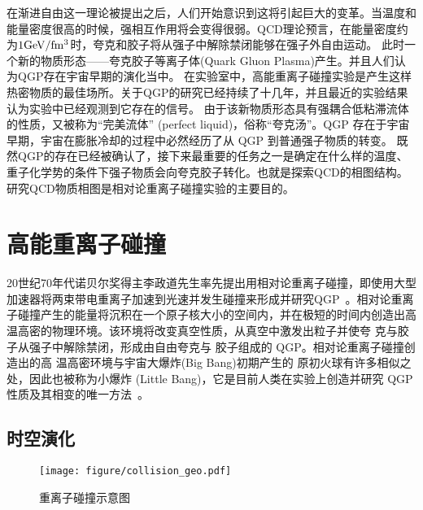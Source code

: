 
在渐进自由这一理论被提出之后，人们开始意识到这将引起巨大的变革。当温度和能量密度很高的时候，强相互作用将会变得很弱。QCD理论预言，在能量密度约为$1\rm{GeV}/fm^{3}$时，夸克和胶子将从强子中解除禁闭能够在强子外自由运动。
此时一个新的物质形态——夸克胶子等离子体(Quark Gluon Plasma)\cite{shuryak1978quark}产生。并且人们认为QGP存在宇宙早期的演化当中。
在实验室中，高能重离子碰撞实验是产生这样热密物质的最佳场所。关于QGP的研究已经持续了十几年，并且最近的实验结果认为实验中已经观测到它存在的信号\cite{arsene2005quark,back2005phobos,adams2005experimental,adcox2005formation,aamodt2010k,aamodt2011k}。
由于该新物质形态具有强耦合低粘滞流体的性质，又被称为“完美流体” (perfect liquid)，俗称“夸克汤”。QGP 存在于宇宙早期，宇宙在膨胀冷却的过程中必然经历了从 QGP 到普通强子物质的转变。
既然QGP的存在已经被确认了，接下来最重要的任务之一是确定在什么样的温度、重子化学势的条件下强子物质会向夸克胶子转化。也就是探索QCD的相图结构。研究QCD物质相图是相对论重离子碰撞实验的主要目的。


\section{高能重离子碰撞}  

20世纪70年代诺贝尔奖得主李政道先生率先提出用相对论重离子碰撞，即使用大型加速器将两束带电重离子加速到光速并发生碰撞来形成并研究QGP~\cite{XiaofengCPreview}。相对论重离子碰撞产生的能量将沉积在一个原子核大小的空间内，并在极短的时间内创造出高温高密的物理环境。该环境将改变真空性质，从真空中激发出粒子并使夸 克与胶子从强子中解除禁闭，形成由自由夸克与 胶子组成的 QGP。相对论重离子碰撞创造出的高 温高密环境与宇宙大爆炸(Big Bang)初期产生的 原初火球有许多相似之处，因此也被称为小爆炸 (Little Bang)，它是目前人类在实验上创造并研究 QGP 性质及其相变的唯一方法~\cite{XiaofengCPreview}。

\subsection{时空演化}

\begin{figure}[htbp]
\centering
\texttt{[image: figure/collision\_geo.pdf]}
\caption{重离子碰撞示意图}
\label{fig:collision_geo_evo}
\end{figure}



